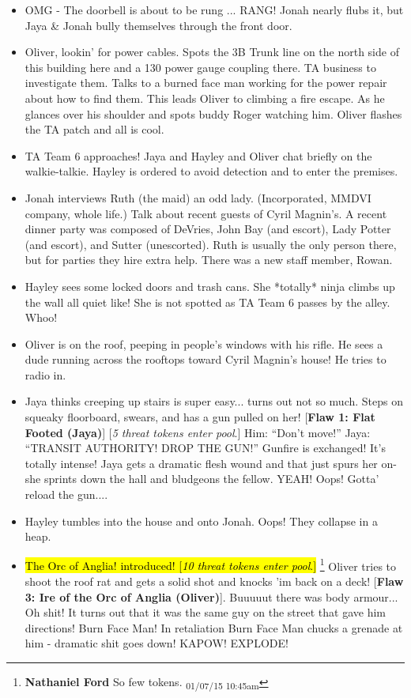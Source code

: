 \begin{itemize}
\item OMG - The doorbell is about to be rung ... RANG! Jonah nearly flubs it, but Jaya \& Jonah bully themselves through the front door.
\item Oliver, lookin' for power cables. Spots the 3B Trunk line on the north side of this building here and a 130 power gauge coupling there.  TA business to investigate them.  Talks to a burned face man working for the power repair about how to find them.  This leads Oliver to climbing a fire escape.  As he glances over his shoulder and spots buddy Roger watching him.  Oliver flashes the TA patch and all is cool. 
\item TA Team 6 approaches!   Jaya and Hayley and Oliver chat briefly on the walkie-talkie.  Hayley is ordered to avoid detection and to enter the premises. 
\item Jonah interviews Ruth (the maid) an odd lady.  (Incorporated, MMDVI company, whole life.) Talk about recent guests of Cyril Magnin's.  A recent dinner party was composed of DeVries, John Bay (and escort), Lady Potter (and escort), and Sutter (unescorted).  Ruth is usually the only person there, but for parties they hire extra help.  There was a new staff member, Rowan.
\item Hayley sees some locked doors and trash cans.  She *totally* ninja climbs up the wall all quiet like!  She is not spotted as TA Team 6 passes by the alley.  Whoo! 
\item Oliver is on the roof, peeping in people's windows with his rifle.  He sees a dude running across the rooftops toward Cyril Magnin's house!  He tries to radio in.
\item Jaya thinks creeping up stairs is super easy... turns out not so much.  Steps on squeaky floorboard, swears, and has a gun pulled on her!   {[}\textbf{Flaw 1: Flat Footed (Jaya)}{]} {[}\textit{5 threat tokens enter pool}.{]}   Him: ``Don't move!''  Jaya: ``TRANSIT AUTHORITY! DROP THE GUN!''    Gunfire is exchanged! It's totally intense!  Jaya gets a dramatic flesh wound and that just spurs her on- she sprints down the hall and bludgeons the fellow.  YEAH!  Oops! Gotta' reload the gun.... 
\item Hayley tumbles into the house and onto Jonah.  Oops!   They collapse in a heap.
\item \hl{The Orc of Anglia! introduced!  {[}\textit{10 threat tokens enter pool}.{]} }\footnote{\textbf{Nathaniel Ford }So few tokens. \textsubscript{01/07/15 10:45am}} Oliver tries to shoot the roof rat and gets a solid shot and knocks 'im back on a deck!  {[}\textbf{Flaw 3: Ire of the Orc of Anglia (Oliver)}{]}. Buuuuut there was body armour...  Oh shit! It turns out that it was the same guy on the street that gave him directions! Burn Face Man!  In retaliation Burn Face Man chucks a grenade at him - dramatic shit goes down!  KAPOW! EXPLODE! 

\end{itemize}
